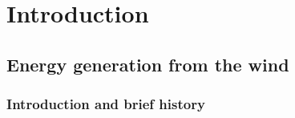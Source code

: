 \chapter{Introduction}
\label{sec:intro}

\clearpage
\section{Energy generation from the wind}
\label{sec:intro_engen}


\subsection{Introduction and brief history}
\label{sec:intro_history}

